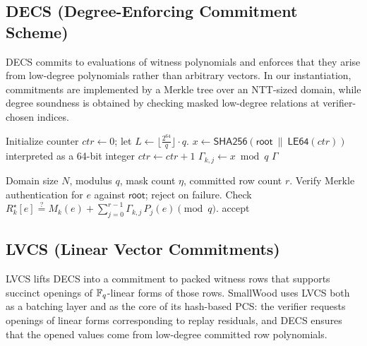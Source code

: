 \subsection{DECS (Degree-Enforcing Commitment Scheme)}
DECS commits to evaluations of witness polynomials and enforces that they arise
from low-degree polynomials rather than arbitrary vectors. In our
instantiation, commitments are implemented by a Merkle tree over an NTT-sized
domain, while degree soundness is obtained by checking masked low-degree
relations at verifier-chosen indices.

\begin{algorithm}[H]
\caption{\textsf{DECS.DeriveGamma}(\(\mathsf{root},\eta,r,q\)) \(\to \Gamma\) (verifier and prover)}
\label{alg:decs-derivegamma}
\begin{algorithmic}[1]
\State Initialize counter \(ctr\gets 0\); let \(L\gets \big\lfloor \frac{2^{64}}{q}\big\rfloor\cdot q\).
    \Repeat
      \State \(x \gets \textsf{SHA256}(\mathsf{root}\ \|\ \textsf{LE64}(ctr))\) interpreted as a 64-bit integer
      \State \(ctr\gets ctr+1\)
    \State \(\Gamma_{k,j}\gets x \bmod q\)
  \EndFor
\EndFor
\State \Return \(\Gamma\)
\end{algorithmic}
\end{algorithm}

\begin{algorithm}[H]
\caption{\textsf{DECS.VerifyEval}(\(\mathsf{root},\Gamma,R,\mathsf{open}\)) (verifier)}
\label{alg:decs-verifyeval}
\begin{algorithmic}[1]
\Require Domain size \(N\), modulus \(q\), mask count \(\eta\), committed row count \(r\).
  \State Verify Merkle authentication for \(e\) against \(\mathsf{root}\); reject on failure.
    \State Check \(R_k^\star[e] \stackrel{?}{=} M_k(e) + \sum_{j=0}^{r-1}\Gamma_{k,j}\,P_j(e)\pmod q\).
  \EndFor
\EndFor
\State \Return accept
\end{algorithmic}
\end{algorithm}

\subsection{LVCS (Linear Vector Commitments)}
LVCS lifts DECS into a commitment to packed witness rows that supports succinct
openings of \(\mathbb{F}_q\)-linear forms of those rows. SmallWood uses LVCS both as a
batching layer and as the core of its hash-based PCS: the verifier requests
openings of linear forms corresponding to replay residuals, and DECS ensures
that the opened values come from low-degree committed row polynomials.

